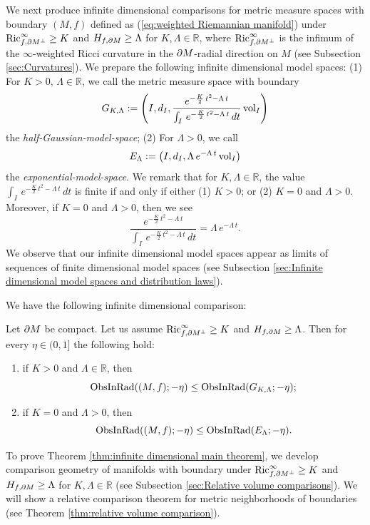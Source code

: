 We next produce infinite dimensional comparisons for metric measure spaces with boundary $(M,f)$ defined as (\ref{eq:weighted Riemannian manifold}) under $\operatorname{Ric}^{\infty}_{f,\partial M^{\perp}}\geq K$ and $H_{f,\partial M}\geq \Lambda$ for $K,\Lambda\in \mathbb{R}$,
where $\operatorname{Ric}^{\infty}_{f,\partial M^{\perp}}$ is the infimum of the $\infty$-weighted Ricci curvature in the $\partial M$-radial direction on $M$ (see Subsection \ref{sec:Curvatures}).
We prepare the following infinite dimensional model spaces: 
(1) For $K>0,\,\Lambda \in \mathbb{R}$,
we call the metric measure space with boundary
\begin{equation}\label{eq:Gaussian model space}
G_{K,\Lambda}:=\left(I,d_{I}, \frac{e^{-\frac{K}{2}\,t^{2}-\Lambda\,t}}{\int_{I}\,e^{-\frac{K}{2}\,t^{2}-\Lambda\,t}\,    dt} \operatorname{vol}_{I} \right)
\end{equation}
the \textit{half-Gaussian-model-space};
(2) For $\Lambda>0$,
we call
\begin{equation}\label{eq:exponential model space}
E_{\Lambda}:=\left(I,d_{I}, \Lambda\,e^{-\Lambda\,t} \operatorname{vol}_{I} \right)
\end{equation}
the \textit{exponential-model-space}.
We remark that
for $K,\Lambda\in \mathbb{R}$,
the value $\int_{I}\,e^{-\frac{K}{2}\,t^{2}-\Lambda\,t}\,    dt$ is finite if and only if
either (1) $K>0$;
or (2) $K=0$ and $\Lambda>0$.
Moreover,
if $K=0$ and $\Lambda>0$,
then we see
\begin{equation*}
\frac{e^{-\frac{K}{2}\,t^{2}-\Lambda\,t}}{\int_{I}\,e^{-\frac{K}{2}\,t^{2}-\Lambda\,t}\,    dt}=\Lambda\,e^{-\Lambda\,t}.
\end{equation*}
We observe that
our infinite dimensional model spaces appear as limits of sequences of finite dimensional model spaces (see Subsection \ref{sec:Infinite dimensional model spaces and distribution laws}).

We have the following infinite dimensional comparison:
\begin{thm}\label{thm:infinite dimensional main theorem}
Let $\partial M$ be compact.
Let us assume $\operatorname{Ric}^{\infty}_{f,\partial M^{\perp}}\geq K$ and $H_{f,\partial M}\geq \Lambda$.
Then for every $\eta \in (0,1]$
the following hold:
\begin{enumerate}
\item if $K>0$ and $\Lambda \in \mathbb{R}$,
         then
         \begin{equation*}
         \operatorname{ObsInRad}((M,f);-\eta) \leq \operatorname{ObsInRad}(G_{K,\Lambda};-\eta);
         \end{equation*}
\item if $K=0$ and $\Lambda>0$,
         then
         \begin{equation*}
         \operatorname{ObsInRad}((M,f);-\eta) \leq \operatorname{ObsInRad}(E_{\Lambda};-\eta).
         \end{equation*}
\end{enumerate}
\end{thm}
To prove Theorem \ref{thm:infinite dimensional main theorem},
we develop comparison geometry of manifolds with boundary under $\operatorname{Ric}^{\infty}_{f,\partial M^{\perp}}\geq K$ and $H_{f,\partial M}\geq \Lambda$ for $K,\Lambda\in \mathbb{R}$ (see Subsection \ref{sec:Relative volume comparisons}).
We will show a relative comparison theorem for metric neighborhoods of boundaries (see Theorem \ref{thm:relative volume comparison}).

